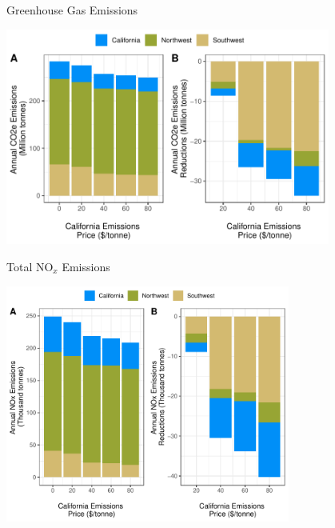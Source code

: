 \documentclass[11pt, aspectratio = 169]{beamer}
\newcommand{\1}{\mathds{1}}
\begin{document}
\begin{frame}{Greenhouse Gas Emissions}
    
\centering
\includegraphics[width = 0.8\textwidth]{figures/chapter5_figures/sim_co2e_bca.pdf}

\end{frame}

\begin{frame}{Total NO$_x$ Emissions}

\centering
\includegraphics[width = 0.7\textwidth]{figures/chapter5_figures/sim_nox_bca.pdf}

\end{frame}


        
\end{document}
